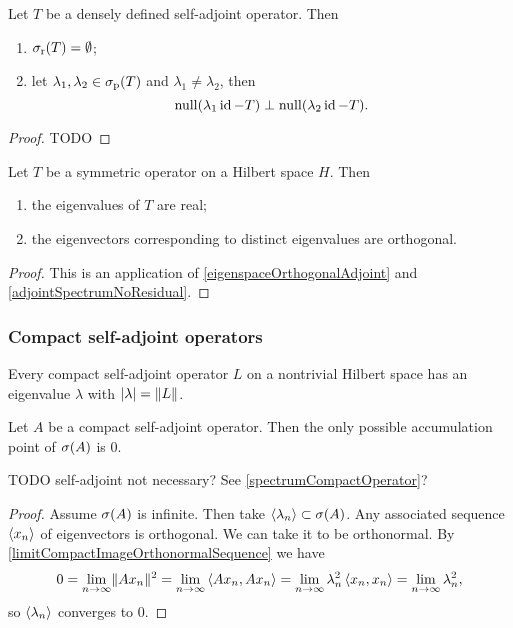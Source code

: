 \begin{proposition}
Let $T$ be a densely defined self-adjoint operator. Then
\begin{enumerate}
\item $\sigma_\text{r}(T) = \emptyset$;
\item let $\lambda_1,\lambda_2 \in \sigma_\text{p}(T)$ and $\lambda_1\neq \lambda_2$, then 
\[ \operatorname{null}(\lambda_1\operatorname{id} - T) \perp \operatorname{null}(\lambda_2 \operatorname{id} - T). \]
\end{enumerate}
\end{proposition}
\begin{proof}
TODO
\end{proof}


\begin{proposition}
Let $T$ be a symmetric operator on a Hilbert space $H$. Then
\begin{enumerate}
\item the eigenvalues of $T$ are real;
\item the eigenvectors corresponding to distinct eigenvalues are orthogonal.
\end{enumerate}
\end{proposition}
\begin{proof}
This is an application of \ref{eigenspaceOrthogonalAdjoint} and \ref{adjointSpectrumNoResidual}.
\end{proof}

\subsubsection{Compact self-adjoint operators}
\begin{proposition}
Every compact self-adjoint operator $L$ on a nontrivial Hilbert space has an eigenvalue $\lambda$ with $|\lambda| = \lVert L\rVert$.
\end{proposition}

\begin{proposition}
Let $A$ be a compact self-adjoint operator. Then the only possible accumulation point of $\sigma(A)$ is $0$.
\end{proposition}
TODO self-adjoint not necessary? See \ref{spectrumCompactOperator}?
\begin{proof}
Assume $\sigma(A)$ is infinite. Then take $\left\langle \lambda_n \right\rangle\subset \sigma(A)$. Any associated sequence $\left\langle x_n \right\rangle$ of eigenvectors is orthogonal. We can take it to be orthonormal. By \ref{limitCompactImageOrthonormalSequence} we have
\[ 0 = \lim_{n\to\infty} \lVert Ax_n\rVert^2 = \lim_{n\to\infty}\left\langle Ax_n,Ax_n \right\rangle = \lim_{n\to\infty}\lambda_n^2\left\langle x_n,x_n \right\rangle = \lim_{n\to\infty}\lambda_n^2, \]
so $\left\langle \lambda_n \right\rangle$ converges to $0$.
\end{proof}

